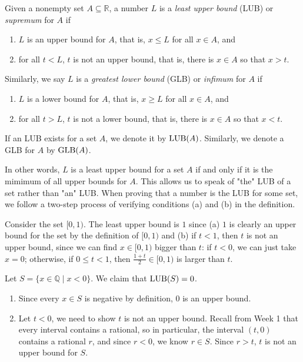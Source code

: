\documentclass[11pt,dvipsnames]{book}
\numberwithin{equation}{section} %
\numberwithin{figure}{section} %
\numberwithin{table}{section} %
\begin{document}
\begin{definition}
Given a nonempty set $A\subseteq \mathbb{R}$, a number $L$ is a {\it least upper bound} (LUB) or {\it supremum} for $A$ if
\begin{enumerate}[label=(\alph*)]
\item $L$ is an upper bound for $A$, that is, $x\leq L$ for all $x\in A$, and
\item for all $t<L$, $t$ is not an upper bound, that is, there is $x\in A$ so that $x>t$. 
\end{enumerate}
Similarly, we say $L$ is a {\it greatest lower bound} (GLB) or {\it infimum} for $A$ if
\begin{enumerate}[label=(\alph*)]
\item $L$ is a lower bound for $A$, that is, $x\geq L$ for all $x\in A$, and
\item for all $t>L$, $t$ is not a lower bound, that is, there is $x\in A$ so that $x<t$. 
\end{enumerate}
If an LUB exists for a set $A$, we denote it by ${\rm LUB}(A)$. Similarly, we denote a GLB for $A$ by ${\rm GLB}(A)$.
\end{definition}

In other words, $L$ is a least upper bound for a set $A$ if and only if it is the mimimum of all upper bounds for $A$. This allows us to speak of "the" LUB of a set rather than "an" LUB. When proving that a number is the LUB for some set, we follow a two-step process of verifying conditions (a) and (b) in the definition. 

\begin{example}
Consider the set $[0,1)$. The least upper bound is $1$ since (a) $1$ is clearly an upper bound for the set by the definition of $[0,1)$ and (b) if $t<1$, then $t$ is not an upper bound, since we can find $x\in [0,1)$ bigger than $t$: if $t<0$, we can just take $x=0$; otherwise, if $0\leq t<1$, then $\frac{1+t}{2}\in [0,1)$ is larger than $t$. 
\end{example}


\begin{example}
Let $S=\{x\in\mathbb{Q} \; | \; x<0\}$. We claim that ${\rm LUB}(S)=0$. 

\begin{enumerate}[label=(\alph*)]
\item Since every $x\in S$ is negative by definition, $0$ is an upper bound. 
\item Let $t<0$, we need to show $t$ is not an upper bound. Recall from Week 1 that every interval contains a rational, so in particular, the interval $(t,0)$ contains a rational $r$, and since $r<0$, we know $r\in S$. Since $r>t$, $t$ is not an upper bound for $S$.
\end{enumerate}
\end{example}
\end{document}
